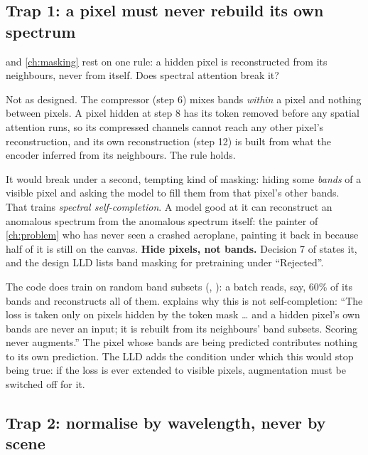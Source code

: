 \subsection{Trap 1: a pixel must never rebuild its own spectrum}

 and \cref{ch:masking} rest on one rule: a hidden pixel is reconstructed from its neighbours, never from itself. Does spectral attention break it?

Not as designed. The compressor (step 6) mixes bands \emph{within} a pixel and nothing between pixels. A pixel hidden at step 8 has its token removed before any spatial attention runs, so its compressed channels cannot reach any other pixel's reconstruction, and its own reconstruction (step 12) is built from what the encoder inferred from its neighbours. The rule holds.

It would break under a second, tempting kind of masking: hiding some \emph{bands} of a visible pixel and asking the model to fill them from that pixel's other bands. That trains \emph{spectral self-completion}. A model good at it can reconstruct an anomalous spectrum from the anomalous spectrum itself: the painter of \cref{ch:problem} who has never seen a crashed aeroplane, painting it back in because half of it is still on the canvas. \textbf{Hide pixels, not bands.} Decision 7 of  states it, and the design LLD lists band masking for pretraining under ``Rejected''.

\begin{sourcenote}
The code does train on random band subsets (, ): a batch reads, say, 60\% of its bands and reconstructs all of them.  explains why this is not self-completion: ``The loss is taken only on pixels hidden by the token mask \ldots{} and a hidden pixel's own bands are never an input; it is rebuilt from its neighbours' band subsets. Scoring never augments.'' The pixel whose bands are being predicted contributes nothing to its own prediction. The LLD adds the condition under which this would stop being true: if the loss is ever extended to visible pixels, augmentation must be switched off for it.
\end{sourcenote}

\subsection{Trap 2: normalise by wavelength, never by scene}

